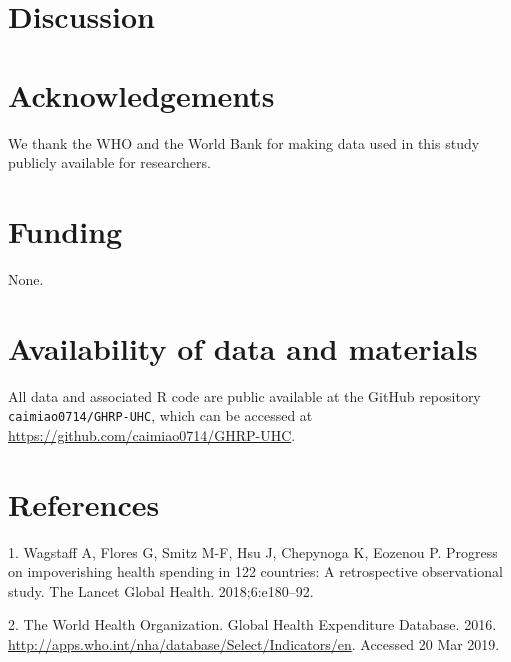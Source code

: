 \documentclass[]{elsarticle} %
\begin{document}
\hypertarget{discussion}{%
\section{Discussion}\label{discussion}}

\hypertarget{acknowledgements}{%
\section*{Acknowledgements}\label{acknowledgements}}

We thank the WHO and the World Bank for making data used in this study publicly available for researchers.

\hypertarget{funding}{%
\section*{Funding}\label{funding}}

None.

\hypertarget{availability-of-data-and-materials}{%
\section*{Availability of data and materials}\label{availability-of-data-and-materials}}

All data and associated R code are public available at the GitHub repository \texttt{caimiao0714/GHRP-UHC}, which can be accessed at \url{https://github.com/caimiao0714/GHRP-UHC}.

\hypertarget{references}{%
\section*{References}\label{references}}

\hypertarget{refs}{}
\leavevmode\hypertarget{ref-wagstaff2018progress}{}%
1. Wagstaff A, Flores G, Smitz M-F, Hsu J, Chepynoga K, Eozenou P. Progress on impoverishing health spending in 122 countries: A retrospective observational study. The Lancet Global Health. 2018;6:e180--92.

\leavevmode\hypertarget{ref-WHOdata}{}%
2. The World Health Organization. Global Health Expenditure Database. 2016. \url{http://apps.who.int/nha/database/Select/Indicators/en}. Accessed 20 Mar 2019.
\end{document}

